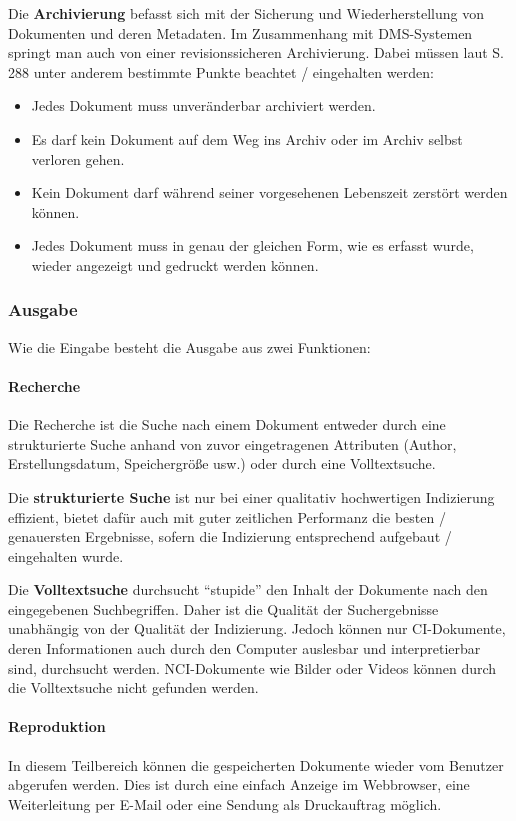Die \textbf{Archivierung} befasst sich mit der Sicherung und Wiederherstellung von Dokumenten und deren Metadaten.
Im Zusammenhang mit DMS-Systemen springt man auch von einer revisionssicheren Archivierung.
Dabei müssen laut \cite{DMS08} S. 288 unter anderem bestimmte Punkte beachtet / eingehalten werden:

\begin{itemize}
\item Jedes Dokument muss unveränderbar archiviert werden.
\item Es darf kein Dokument auf dem Weg ins Archiv oder im Archiv selbst verloren gehen.
\item Kein Dokument darf während seiner vorgesehenen Lebenszeit zerstört werden können.
\item Jedes Dokument muss in genau der gleichen Form, wie es erfasst wurde, wieder angezeigt und gedruckt werden können.
\end{itemize}

\subsubsection{Ausgabe}
Wie die Eingabe besteht die Ausgabe aus zwei Funktionen:

\paragraph{Recherche}
Die Recherche ist die Suche nach einem Dokument entweder durch eine strukturierte Suche anhand von zuvor eingetragenen Attributen (Author, Erstellungsdatum, Speichergröße usw.) oder durch eine Volltextsuche.

Die \textbf{strukturierte Suche} ist nur bei einer qualitativ hochwertigen Indizierung effizient, bietet dafür auch mit guter zeitlichen Performanz die besten / genauersten Ergebnisse, sofern die Indizierung entsprechend aufgebaut / eingehalten wurde.

Die \textbf{Volltextsuche} durchsucht "`stupide"' den Inhalt der Dokumente nach den eingegebenen Suchbegriffen.
Daher ist die Qualität der Suchergebnisse unabhängig von der Qualität der Indizierung.
Jedoch können nur \gls{CI}-Dokumente, deren Informationen auch durch den Computer auslesbar und interpretierbar sind, durchsucht werden.
\gls{NCI}-Dokumente wie Bilder oder Videos können durch die Volltextsuche nicht gefunden werden.

\paragraph{Reproduktion}
In diesem Teilbereich können die gespeicherten Dokumente wieder vom Benutzer abgerufen werden.
Dies ist durch eine einfach Anzeige im Webbrowser, eine Weiterleitung per E-Mail oder eine Sendung als Druckauftrag möglich.



